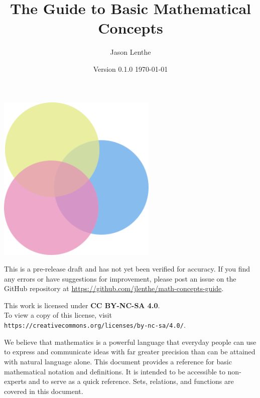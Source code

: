 \documentclass[letterpaper]{article}
\title{\sffamily\textbf{The Guide to Basic Mathematical Concepts}}
\author{\sffamily Jason Lenthe}
\date{Version 0.1.0 \quad \today}
\begin{document}
\maketitle
\vskip 0.5in
\begin{center}
    \includegraphics[width=3in]{images/logo.png}
\end{center}

\vfill
\begin{warning}
  This is a pre-release draft and has not yet been verified for accuracy.
  If you find any errors or have suggestions for improvement, please post
  an issue on the GitHub repository at
  \url{https://github.com/jlenthe/math-concepts-guide}.
\end{warning}
\begin{center}
    {\small This work is licensed under \textbf{CC BY-NC-SA 4.0}.\\
    To view a copy of this license, visit \texttt{https://creativecommons.org/licenses/by-nc-sa/4.0/}.}
\end{center}

\newpage
\tableofcontents
\newpage

We believe that mathematics is a powerful language that everyday people can
use to express and communicate ideas with far greater precision than can be
attained with natural language alone. This document provides a reference for
basic mathematical notation and definitions. It is intended to be accessible
to non-experts and to serve as a quick reference. Sets, relations, and
functions are covered in this document.









% 
\end{document}
